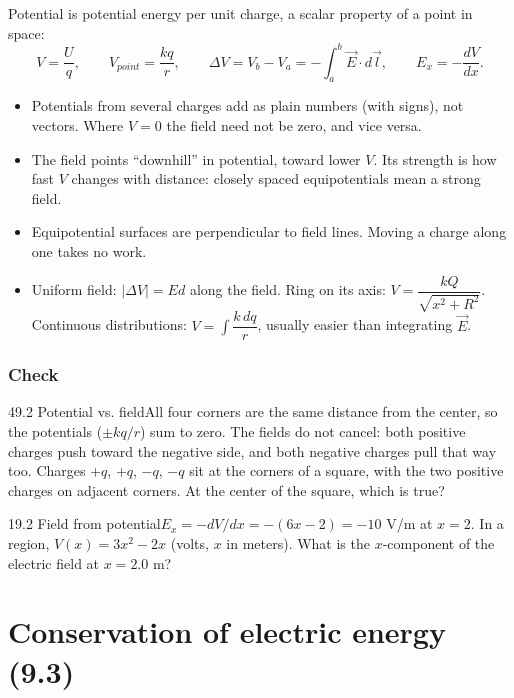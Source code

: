 \documentclass[11pt]{article}
\begin{document}
Potential is potential energy per unit charge, a scalar property of a point in space:
\[ V = \frac{U}{q}, \qquad V_{point} = \frac{kq}{r}, \qquad \Delta V = V_b - V_a = -\int_a^b\vec E\cdot d\vec l, \qquad E_x = -\frac{dV}{dx}. \]
\begin{itemize}
\item Potentials from several charges add as plain numbers (with signs), not vectors. Where $V = 0$ the field need not be zero, and vice versa.
\item The field points ``downhill'' in potential, toward lower $V$. Its strength is how fast $V$ changes with distance: closely spaced equipotentials mean a strong field.
\item Equipotential surfaces are perpendicular to field lines. Moving a charge along one takes no work.
\item Uniform field: $|\Delta V| = Ed$ along the field. Ring on its axis: $V = \dfrac{kQ}{\sqrt{x^2 + R^2}}$. Continuous distributions: $V = \int\dfrac{k\,dq}{r}$, usually easier than integrating $\vec E$.
\end{itemize}

\subsubsection{Check}\mbox{}

\begin{q}{4}{9.2 Potential vs. field}{All four corners are the same distance from the center, so the potentials ($\pm kq/r$) sum to zero. The fields do not cancel: both positive charges push toward the negative side, and both negative charges pull that way too.}
Charges $+q$, $+q$, $-q$, $-q$ sit at the corners of a square, with the two positive charges on adjacent corners. At the center of the square, which is true?
\end{q}
\begin{q}{1}{9.2 Field from potential}{$E_x = -dV/dx = -(6x - 2) = -10$ V/m at $x = 2$.}
In a region, $V(x) = 3x^2 - 2x$ (volts, $x$ in meters). What is the $x$-component of the electric field at $x = 2.0$ m?
\end{q}

\section{Conservation of electric energy (9.3)}\label{sec:3}
\end{document}
